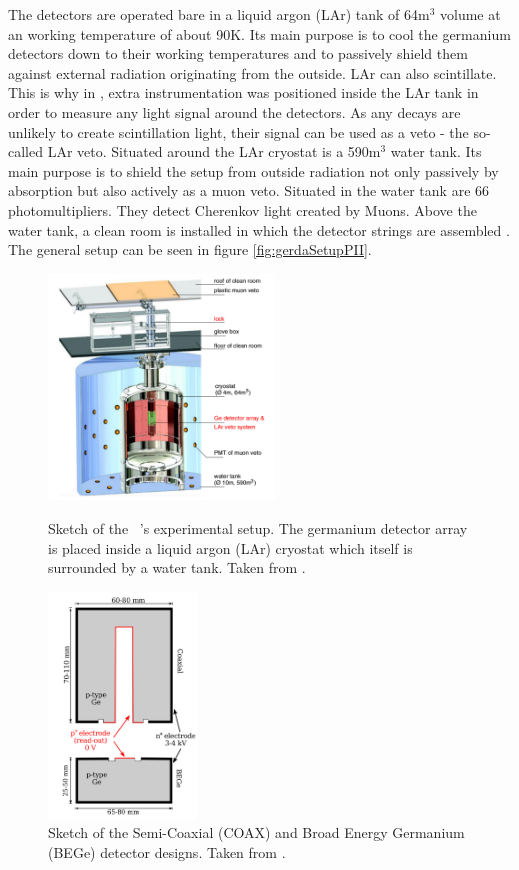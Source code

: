 \documentclass[encoding=utf8,british]{tumphthesis}
\begin{document}
The detectors are operated bare in a liquid argon (LAr) tank of 64m$^3$ volume at an working temperature of about 90K.
Its main purpose is to cool the germanium detectors down to their working temperatures and to passively shield them against external radiation originating from the outside.
LAr can also scintillate.
This is why in \PII, extra instrumentation was positioned inside the LAr tank in order to measure any light signal around the detectors.
As any  decays are unlikely to create scintillation light, their signal can be used as a veto - the so-called LAr veto.
Situated around the LAr cryostat is a 590m$^3$ water tank.
Its main purpose is to shield the setup from outside radiation not only passively by absorption but also actively as a muon veto.
Situated in the water tank are 66 photomultipliers.
They detect Cherenkov light created by Muons.
Above the water tank, a clean room is installed in which the detector strings are assembled  \cite{agostini_background_2017}.  
The general setup can be seen in figure \ref{fig:gerdaSetupPII}.
\\

\begin{figure}[t!]
	\centering
	\begin{minipage}[t!]{.45\textwidth}
		\centering
		\includegraphics[height=60mm]{./Bilder/GERDAsetupPhaseII.png}
		\caption{Sketch of the \gerda\ \PII's experimental setup. The germanium detector array is placed inside a liquid argon (LAr) cryostat which itself is surrounded by a water tank. Taken from \cite{collaboration_upgrade_2018}.}
		\label{fig:gerdaSetupPII}
	\end{minipage}\hfill%
	\begin{minipage}[t!]{.45\textwidth}
		\centering
		\includegraphics[height=60mm]{./Bilder/DetectorDesign.png}
		\caption{Sketch of the Semi-Coaxial (COAX) and Broad Energy Germanium (BEGe) detector designs. Taken from \cite{agostini_background_2014}.}
		\label{fig:DetcDes}
	\end{minipage}
\end{figure}
\end{document}
